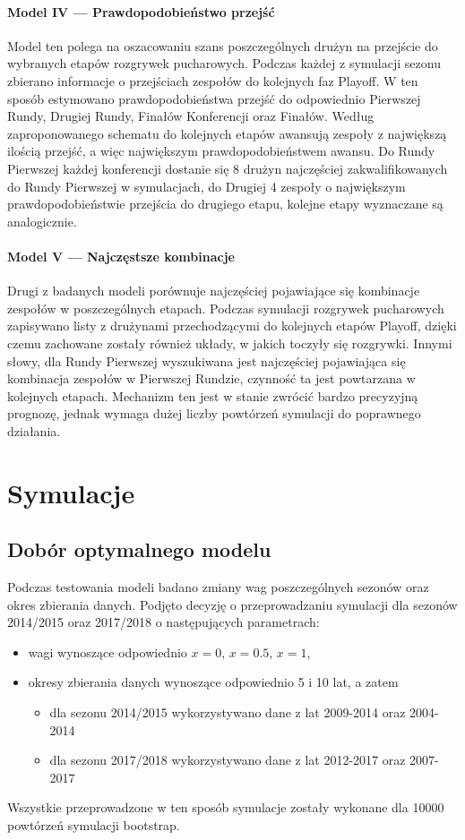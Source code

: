 \documentclass[inzynierska]{pwr_wmat_praca_dyplomowa}
\theoremstyle{plain}
\numberwithin{theorem}{chapter}
\theoremstyle{definition}
\numberwithin{theorem}{chapter}
\begin{document}
\subsubsection{Model IV --- Prawdopodobieństwo przejść}
Model ten polega na oszacowaniu szans poszczególnych drużyn na przejście do wybranych etapów rozgrywek pucharowych. Podczas każdej z symulacji sezonu zbierano informacje o przejściach zespołów do kolejnych faz Playoff. W ten sposób estymowano prawdopodobieństwa przejść do odpowiednio Pierwszej Rundy, Drugiej Rundy, Finałów Konferencji oraz Finałów. Według zaproponowanego schematu do kolejnych etapów awansują zespoły z największą ilością przejść, a więc największym prawdopodobieństwem awansu. Do Rundy Pierwszej każdej konferencji dostanie się 8 drużyn najczęściej zakwalifikowanych do Rundy Pierwszej w symulacjach, do Drugiej 4 zespoły o największym prawdopodobieństwie przejścia do drugiego etapu, kolejne etapy wyznaczane są analogicznie. 

\subsubsection{Model V --- Najczęstsze kombinacje}
Drugi z badanych modeli porównuje najczęściej pojawiające się kombinacje zespołów w poszczególnych etapach. Podczas symulacji rozgrywek pucharowych zapisywano listy z drużynami przechodzącymi do kolejnych etapów Playoff, dzięki czemu zachowane zostały również układy, w jakich toczyły się rozgrywki. Innymi słowy, dla Rundy Pierwszej wyszukiwana jest najczęściej pojawiająca się kombinacja zespołów w Pierwszej Rundzie, czynność ta jest powtarzana w kolejnych etapach. Mechanizm ten jest w stanie zwrócić bardzo precyzyjną prognozę, jednak wymaga dużej liczby powtórzeń symulacji do poprawnego działania. 

\chapter{Symulacje}
\section{Dobór optymalnego modelu}
Podczas testowania modeli badano zmiany wag poszczególnych sezonów oraz okres zbierania danych. Podjęto decyzję o przeprowadzaniu symulacji dla sezonów 2014/2015 oraz 2017/2018 o następujących parametrach:
\begin{itemize}
	\item wagi wynoszące odpowiednio $x=0$, $x=0.5$, $x=1$,
	\item okresy zbierania danych wynoszące odpowiednio 5 i 10 lat, a zatem
	\begin{itemize}
		\item dla sezonu 2014/2015 wykorzystywano dane z lat 2009-2014 oraz 2004-2014
		\item dla sezonu 2017/2018 wykorzystywano dane z lat 2012-2017 oraz 2007-2017
	\end{itemize}
\end{itemize}
Wszystkie przeprowadzone w ten sposób symulacje zostały wykonane dla 10000 powtórzeń symulacji bootstrap. 
\end{document}
